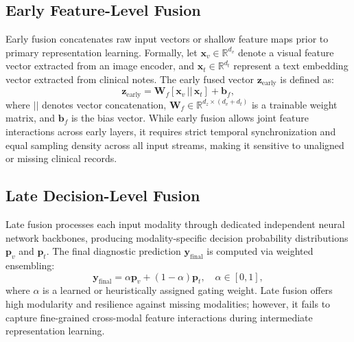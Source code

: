 \documentclass[final,3p,times]{elsarticle}
\begin{document}
\subsection{Early Feature-Level Fusion}
Early fusion concatenates raw input vectors or shallow feature maps prior to primary representation learning. Formally, let $\mathbf{x}_v \in \mathbb{R}^{d_v}$ denote a visual feature vector extracted from an image encoder, and $\mathbf{x}_t \in \mathbb{R}^{d_t}$ represent a text embedding vector extracted from clinical notes. The early fused vector $\mathbf{z}_{\text{early}}$ is defined as:
\begin{equation}
\mathbf{z}_{\text{early}} = \mathbf{W}_f \left[ \mathbf{x}_v \,||\, \mathbf{x}_t \right] + \mathbf{b}_f,
\end{equation}
where $||$ denotes vector concatenation, $\mathbf{W}_f \in \mathbb{R}^{d_z \times (d_v + d_t)}$ is a trainable weight matrix, and $\mathbf{b}_f$ is the bias vector. While early fusion allows joint feature interactions across early layers, it requires strict temporal synchronization and equal sampling density across all input streams, making it sensitive to unaligned or missing clinical records.

\subsection{Late Decision-Level Fusion}
Late fusion processes each input modality through dedicated independent neural network backbones, producing modality-specific decision probability distributions $\mathbf{p}_v$ and $\mathbf{p}_t$. The final diagnostic prediction $\mathbf{y}_{\text{final}}$ is computed via weighted ensembling:
\begin{equation}
\mathbf{y}_{\text{final}} = \alpha \mathbf{p}_v + (1 - \alpha) \mathbf{p}_t, \quad \alpha \in [0, 1],
\end{equation}
where $\alpha$ is a learned or heuristically assigned gating weight. Late fusion offers high modularity and resilience against missing modalities; however, it fails to capture fine-grained cross-modal feature interactions during intermediate representation learning.
\end{document}
